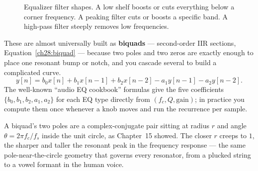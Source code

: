 \begin{figure}[htbp]
\centering
{}
\caption{Equalizer filter shapes. A low shelf boosts or cuts everything below a corner frequency. A peaking filter cuts or boosts a specific band. A high-pass filter steeply removes low frequencies.}
\label{ch28:fig-eq-shapes}
\end{figure}

These are almost universally built as \textbf{biquads} --- second-order IIR
sections, Equation~\eqref{ch28:biquad} --- because two poles and two zeros are
exactly enough to place one resonant bump or notch, and you cascade several to
build a complicated curve.
\begin{equation}
\label{ch28:biquad}
y[n]=b_0x[n]+b_1x[n-1]+b_2x[n-2]-a_1y[n-1]-a_2y[n-2].
\end{equation}
The well-known ``audio EQ cookbook'' formulas give the five coefficients
$\{b_0,b_1,b_2,a_1,a_2\}$ for each EQ type directly from $(f_c, Q, \text{gain})$;
in practice you compute them once whenever a knob moves and run the recurrence per
sample.

\begin{connectionbox}
A biquad's two poles are a complex-conjugate pair sitting at radius $r$ and angle
$\theta=2\pi f_c/f_s$ inside the unit circle, as Chapter~15 showed.
The closer $r$ creeps to $1$, the sharper and taller the resonant peak in the
frequency response --- the same pole-near-the-circle geometry that governs every
resonator, from a plucked string to a vowel formant in the human voice.
\end{connectionbox}


